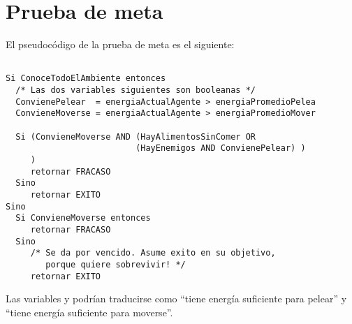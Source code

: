 \section{Prueba de meta}

El pseudocódigo de la prueba de meta es el siguiente:

\begin{verbatim}

Si ConoceTodoElAmbiente entonces
  /* Las dos variables siguientes son booleanas */
  ConvienePelear  = energiaActualAgente > energiaPromedioPelea
  ConvieneMoverse = energiaActualAgente > energiaPromedioMover

  Si (ConvieneMoverse AND (HayAlimentosSinComer OR 
                          (HayEnemigos AND ConvienePelear) )
     )  
     retornar FRACASO
  Sino
     retornar EXITO
Sino
  Si ConvieneMoverse entonces
     retornar FRACASO  
  Sino
     /* Se da por vencido. Asume exito en su objetivo,
        porque quiere sobrevivir! */
     retornar EXITO

\end{verbatim}

Las variables  y  podrían
traducirse como ``tiene energía suficiente para pelear'' y ``tiene energía
suficiente para moverse''.

